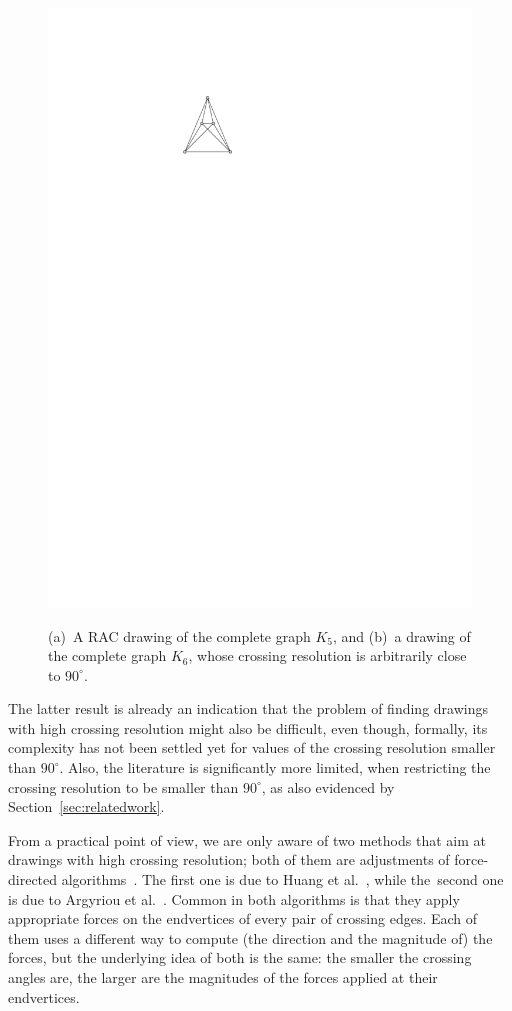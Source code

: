 \documentclass[runningheads]{llncs}
\begin{document}
\begin{figure}[t!]
{	\includegraphics[page=2,scale=0.85]{figures/examples}}
	\caption{%
	(a)~A RAC drawing of the complete graph $K_5$, and
	(b)~a drawing of the complete graph $K_6$, whose crossing resolution is arbitrarily close to $90^\circ$.}
	\label{fig:examples}
\end{figure}

The latter result is already an indication that the problem of finding drawings with high crossing resolution might also be difficult, even though, formally, its complexity has not been settled yet for values of the crossing resolution smaller than $90^\circ$. Also, the literature is significantly more limited, when restricting the crossing resolution to be smaller than $90^\circ$, as also evidenced by Section~\ref{sec:relatedwork}.

From a practical point of view, we are only aware of two methods that aim at drawings with high crossing resolution; both of them are adjustments of force-directed algorithms~\cite{DBLP:journals/congnum/Eades84}. The first one is due to Huang et al.~\cite{DBLP:journals/vlc/HuangEHL13}, while the~second one is due to Argyriou et al.~\cite{DBLP:journals/cj/ArgyriouBS13}. Common in both algorithms is that they apply appropriate forces on the endvertices of every pair of crossing edges. Each of them uses a different way to compute (the direction and the magnitude of) the forces, but the underlying idea of both is the same: the smaller the crossing angles are, the larger are the magnitudes of the forces applied at their endvertices.
\end{document}
